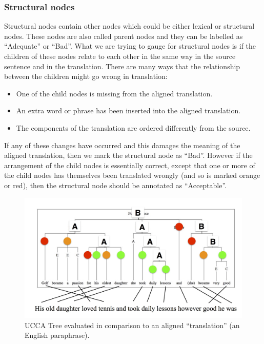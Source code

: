 \documentclass[11pt]{article}
\begin{document}
\subsubsection{Structural nodes}

Structural nodes contain other nodes which could be either lexical or structural nodes. 
These nodes are also called parent nodes and they can be labelled as ``Adequate'' or ``Bad''. 
What we are trying to gauge for structural nodes
is if the children of these nodes
relate to each other in the same way in the source sentence and in the translation. 
There are many ways that the relationship between the children might go wrong in translation:
\begin{itemize}
\item One of the child nodes is missing from the aligned translation. 
\item An extra word or phrase has been inserted into the aligned  translation.
\item The components of the translation are ordered differently 
from
the source.
\end{itemize}

If any of these changes have occurred and this damages the meaning of the aligned translation, then we mark the 
structural node as ``Bad''. 
However if the arrangement of the child nodes is essentially correct, except that one or
more of the child nodes has themselves been translated wrongly (and so is marked
orange or red), then the structural node should be 
annotated as ``Acceptable''.

\begin{figure}[t]
    \includegraphics[width=1\textwidth]{ucca-tree-mteval}
    \caption{UCCA Tree evaluated in comparison to an aligned ``translation'' (an
	English paraphrase).}
    \label{ucca-tree-mteval}
\end{figure}
\end{document}
